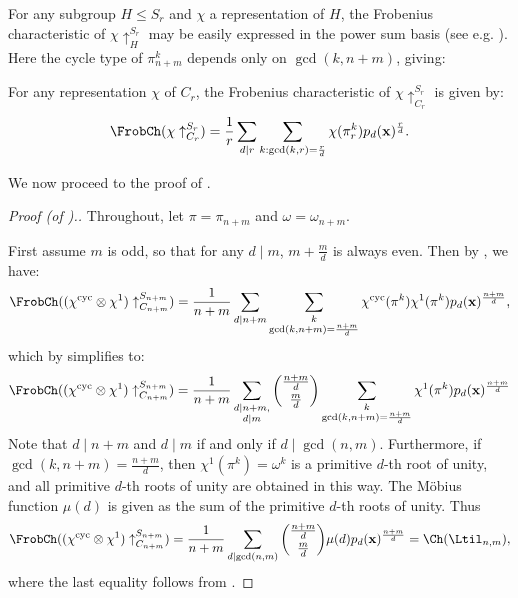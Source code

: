 For any subgroup $H \le S_r$ and $\chi$ a representation of $H$, the Frobenius characteristic of $\chi \uparrow_H^{S_r}$ may be easily expressed in the power sum basis (see e.g. \cite[Theorem~13]{Swa}). Here the cycle type of $\pi_{n+m}^k$ depends only on $\gcd(k,n+m)$, giving:
\begin{lemma}\label{induced-rep-char}
For any representation $\chi$ of $C_r$, the Frobenius characteristic of $\chi \uparrow_{C_r}^{S_r}$ is given by:
\[
\FrobCh(\chi \uparrow_{C_r}^{S_r}) = \frac{1}{r} \sum_{d \mid r} \sum_{k : \gcd(k,r) = \frac{r}{d}} \chi(\pi_r^k) p_d(\mathbf{x})^{\frac{r}{d}}.
\]
\end{lemma}
We now proceed to the proof of .
\begin{proof}[Proof (of ).]
Throughout, let $\pi = \pi_{n+m}$ and $\omega = \omega_{n+m}$. 

First assume $m$ is odd, so that for any $d \mid m$, $m+\frac{m}{d}$ is always even. Then by , we have:
\[
\FrobCh((\chi^\mathrm{cyc} \otimes \chi^1)\uparrow_{C_{n+m}}^{S_{n+m}}) = \frac{1}{n+m} \sum_{d \mid n+m} \sum_{\substack{k\\\gcd(k,n+m) = \frac{n+m}{d}}} \chi^\mathrm{cyc}(\pi^k) \chi^1(\pi^k) p_d(\mathbf{x})^{\frac{n+m}{d}},
\]
which by  simplifies to:
\[
\FrobCh((\chi^\mathrm{cyc} \otimes \chi^1)\uparrow_{C_{n+m}}^{S_{n+m}}) = \frac{1}{n+m} \sum_{\substack{d \mid n+m, \\ d \mid m}} \binom{\frac{n+m}{d}}{\frac{m}{d}} \sum_{\substack{k \\ \gcd(k,n+m) = \frac{n+m}{d}}} \chi^1(\pi^k) p_d(\mathbf{x})^{\frac{n+m}{d}}
\]
Note that $d \mid n+m$ and $d \mid m$ if and only if $d \mid \gcd(n,m)$. Furthermore, if $\gcd(k,n+m) = \frac{n+m}{d}$, then $\chi^1(\pi^k) = \omega^k$ is a primitive $d$-th root of unity, and all primitive $d$-th roots of unity are obtained in this way. The M{\"o}bius function $\mu(d)$ is given as the sum of the primitive $d$-th roots of unity. Thus
\[
\FrobCh((\chi^\mathrm{cyc} \otimes \chi^1)\uparrow_{C_{n+m}}^{S_{n+m}}) = \frac{1}{n+m} \sum_{\substack{d \mid \gcd(n,m)}} \binom{\frac{n+m}{d}}{\frac{m}{d}} \mu(d) p_d(\mathbf{x})^{\frac{n+m}{d}} = \Ch(\Ltil_{n,m}),
\]
where the last equality follows from .


\end{proof}
